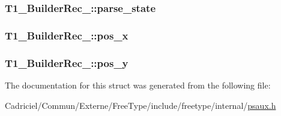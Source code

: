 \hypertarget{struct_t1___builder_rec___afaa675cc3601ed05ed86bc474153094b}{
\subsubsection[{parse\-\_\-state}]{ T1\-\_\-\-Builder\-Rec\-\_\-\-::parse\-\_\-state}}\label{struct_t1___builder_rec___afaa675cc3601ed05ed86bc474153094b}
\hypertarget{struct_t1___builder_rec___ad3e29097d00fa1941ac17273c1310a92}{
\subsubsection[{pos\-\_\-x}]{ T1\-\_\-\-Builder\-Rec\-\_\-\-::pos\-\_\-x}}\label{struct_t1___builder_rec___ad3e29097d00fa1941ac17273c1310a92}
\hypertarget{struct_t1___builder_rec___ad389bf0d5182b677ed3dba05a9612530}{
\subsubsection[{pos\-\_\-y}]{ T1\-\_\-\-Builder\-Rec\-\_\-\-::pos\-\_\-y}}\label{struct_t1___builder_rec___ad389bf0d5182b677ed3dba05a9612530}


The documentation for this struct was generated from the following file\-:\begin{DoxyCompactItemize}
\item 
Cadriciel/\-Commun/\-Externe/\-Free\-Type/include/freetype/internal/\hyperlink{psaux_8h}{psaux.\-h}\end{DoxyCompactItemize}
